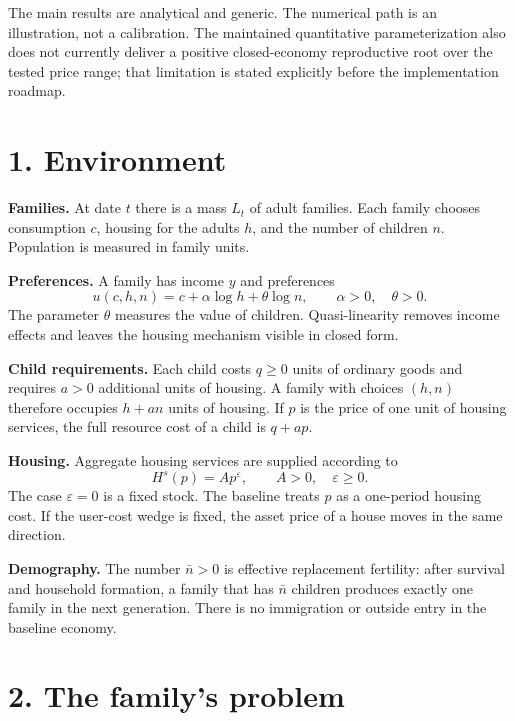 \documentclass[11pt]{article}
\theoremstyle{definition}
\begin{document}
The main results are analytical and generic. The numerical path is an
illustration, not a calibration. The maintained quantitative parameterization
also does not currently deliver a positive closed-economy reproductive root
over the tested price range; that limitation is stated explicitly before the
implementation roadmap.

\section*{1. Environment}

\textbf{Families.} At date $t$ there is a mass $L_t$ of adult families. Each
family chooses consumption $c$, housing for the adults $h$, and the number of
children $n$. Population is measured in family units.

\textbf{Preferences.} A family has income $y$ and preferences
\begin{equation}
 u(c,h,n)=c+\alpha\log h+\theta\log n,
 \qquad \alpha>0,\quad \theta>0.
 \label{eq:utility}
\end{equation}
The parameter $\theta$ measures the value of children. Quasi-linearity removes
income effects and leaves the housing mechanism visible in closed form.

\textbf{Child requirements.} Each child costs $q\geq0$ units of ordinary goods
and requires $a>0$ additional units of housing. A family with choices $(h,n)$
therefore occupies $h+an$ units of housing. If $p$ is the price of one unit of
housing services, the full resource cost of a child is $q+ap$.

\textbf{Housing.} Aggregate housing services are supplied according to
\begin{equation}
 H^s(p)=A p^{\varepsilon},
 \qquad A>0,\quad \varepsilon\geq0.
 \label{eq:supply}
\end{equation}
The case $\varepsilon=0$ is a fixed stock. The baseline treats $p$ as a
one-period housing cost. If the user-cost wedge is fixed, the asset price of a
house moves in the same direction.

\textbf{Demography.} The number $\bar n>0$ is effective replacement fertility:
after survival and household formation, a family that has $\bar n$ children
produces exactly one family in the next generation. There is no immigration or
outside entry in the baseline economy.

\section*{2. The family's problem}
\end{document}
